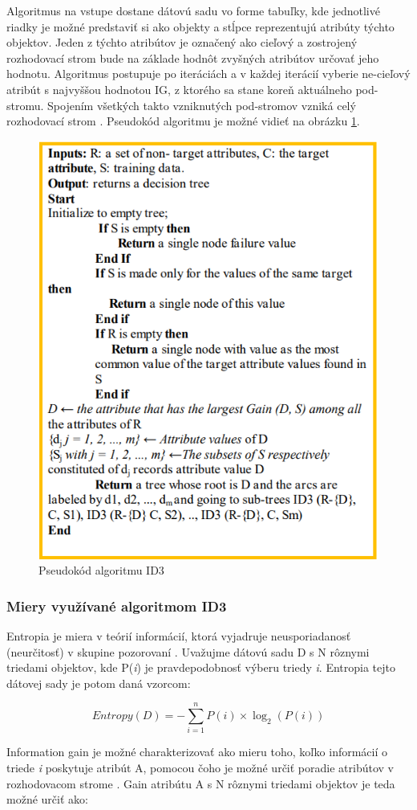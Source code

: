 \documentclass[slovak, master]{diploma}
\begin{document}
Algoritmus na vstupe dostane dátovú sadu vo forme tabuľky, kde jednotlivé riadky je možné predstaviť si ako objekty a stĺpce reprezentujú atribúty týchto objektov. Jeden z týchto atribútov je označený ako cieľový a zostrojený rozhodovací strom bude na základe hodnôt zvyšných atribútov určovať jeho hodnotu. Algoritmus postupuje po iteráciách a v každej iterácií vyberie ne-cieľový atribút s najvyššou hodnotou IG, z ktorého sa stane koreň aktuálneho pod-stromu. Spojením všetkých takto vzniknutých pod-stromov vzniká celý rozhodovací strom \cite{hssina2014comparative}. Pseudokód algoritmu je možné vidieť na obrázku \ref{pic:id3Pseudo}.

\begin{figure}[!htb]
    \centering
    \includegraphics[width=.55\textwidth]{Figures/id3Pseudo.png}
    \caption{Pseudokód algoritmu ID3 \cite{hssina2014comparative}}
    \label{pic:id3Pseudo}
\end{figure}

\subsubsection*{Miery využívané algoritmom ID3}
\label{sec:ID3miery}
Entropia je miera v teórií informácií, ktorá vyjadruje neusporiadanosť (neurčitosť) v skupine pozorovaní \cite{EntropyAndGain}. Uvažujme dátovú sadu D s N rôznymi triedami objektov, kde P(\textit{i}) je pravdepodobnosť výberu triedy \textit{i}. Entropia tejto dátovej sady je potom daná vzorcom: 

\[Entropy(D) = -\displaystyle\sum\limits_{i=1}^n P(i) \times \log_2(P(i))\]

Information gain je možné charakterizovať ako mieru toho, koľko informácií o triede \textit{i} poskytuje atribút A, pomocou čoho je možné určiť poradie atribútov v rozhodovacom strome \cite{EntropyAndGain}. Gain atribútu A s N rôznymi triedami objektov je teda možné určiť ako:
\end{document}
